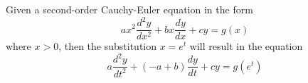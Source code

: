 \documentclass[notes]{subfiles}
\begin{document}
\begin{corollary}
    Given a second-order Cauchy-Euler equation in the form
    \[
        ax^2\frac{d^2y}{dx^2} + bx\frac{dy}{dx} + cy = g(x)
    \]
    where $x > 0$, then the substitution $x = e^t$ will result in the equation
    \[
        a\frac{d^2y}{dt^2} + (-a + b)\frac{dy}{dt} + cy = g(e^t)
    \]
\end{corollary}
\end{document}
